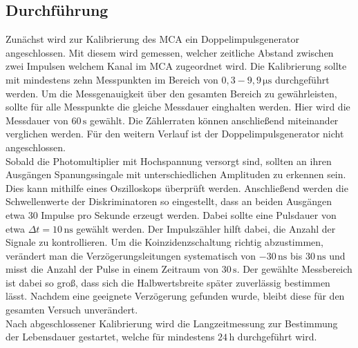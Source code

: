 \subsection{Durchführung}
\label{sec:Durchführung}
Zunächst wird zur Kalibrierung des MCA ein Doppelimpulsgenerator angeschlossen. Mit diesem wird gemessen, welcher zeitliche Abstand zwischen zwei Impulsen welchem Kanal im 
MCA zugeordnet wird. Die Kalibrierung sollte mit mindestens zehn Messpunkten im Bereich von $0,3 - 9,9 \,\unit{\micro\second}$ durchgeführt werden. 
Um die Messgenauigkeit über den gesamten Bereich zu gewährleisten, sollte für alle Messpunkte die gleiche Messdauer einghalten werden. Hier wird die Messdauer von $60\,\unit{\second}$ gewählt.
Die Zählerraten können anschließend miteinander verglichen werden. Für den weitern Verlauf ist der Doppelimpulsgenerator nicht angeschlossen.\\
Sobald die Photomultiplier mit Hochspannung versorgt sind, sollten an ihren Ausgängen Spanungssingale mit unterschiedlichen Amplituden zu erkennen sein.
Dies kann mithilfe eines Oszilloskops überprüft werden.
Anschließend werden die Schwellenwerte der Diskriminatoren so eingestellt, dass an beiden Ausgängen etwa 30 Impulse pro Sekunde erzeugt werden. Dabei sollte eine
Pulsdauer von etwa $\Delta t = 10\,\unit{\nano\second}$ gewählt werden. Der Impulszähler hilft dabei, die Anzahl der Signale zu kontrollieren. Um die Koinzidenzschaltung richtig abzustimmen,
verändert man die Verzögerungsleitungen systematisch von $-30 \, \unit{\nano\second}$ bis $30 \, \unit{\nano\second}$ und misst die Anzahl der Pulse in einem Zeitraum von $30 \, \unit{\second}$. Der gewählte Messbereich
ist dabei so groß, dass sich die Halbwertsbreite später zuverlässig bestimmen lässt. Nachdem eine geeignete Verzögerung gefunden wurde, bleibt diese für den gesamten Versuch unverändert.\\
Nach abgeschlossener Kalibrierung wird die Langzeitmessung zur Bestimmung der Lebensdauer gestartet, welche für mindestens $24\,\unit{\hour}$ durchgeführt wird.
